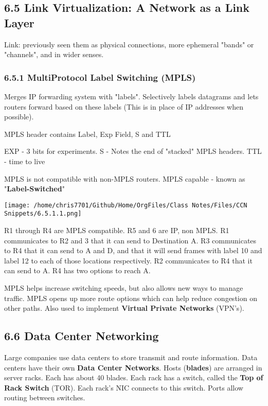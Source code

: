 \documentclass[11pt]{article}
\begin{document}
\subsection{6.5 Link Virtualization: A Network as a Link Layer}
\label{sec:org1be15f6}

Link: previously seen them as physical connections, more ephemeral "bands" or "channels", and in wider senses.

\subsubsection{6.5.1 MultiProtocol Label Switching (MPLS)}
\label{sec:org37d9be7}

Merges IP forwarding system with "labels". Selectively labels datagrams and lets routers forward based on these labels (This is in place of IP addresses when possible).

MPLS header contains Label, Exp Field, S and TTL

EXP - 3 bits for experiments.
S - Notes the end of "stacked" MPLS headers.
TTL - time to live

MPLS is not compatible with non-MPLS routers. MPLS capable - known as "\textbf{Label-Switched}"


\begin{figure*}
\centering
\texttt{[image: /home/chris7701/Github/Home/OrgFiles/Class Notes/Files/CCN Snippets/6.5.1.1.png]}
\end{figure*}

R1 through R4 are MPLS compatible. R5 and 6 are IP, non MPLS.
R1 communicates to R2 and 3 that it can send to Destination A. R3 communicates to R4 that it can send to A and D, and that it will send frames with label 10 and label 12 to each of those locations respectively. R2 communicates to R4 that it can send to A. R4 has two options to reach A.

MPLS helps increase switching speeds, but also allows new ways to manage traffic. MPLS opens up more route options which can help reduce congestion on other paths. Also used to implement \textbf{Virtual Private Networks} (VPN's). 

\subsection{6.6 Data Center Networking}
\label{sec:orgb991504}

Large companies use data centers to store transmit and route information. Data centers have their own \textbf{Data Center Networks}.
Hosts (\textbf{blades}) are arranged in server racks. Each has about 40 blades. Each rack has a switch, called the \textbf{Top of Rack Switch} (TOR).
Each rack's NIC connects to this switch. Ports allow routing between switches.
\end{document}
